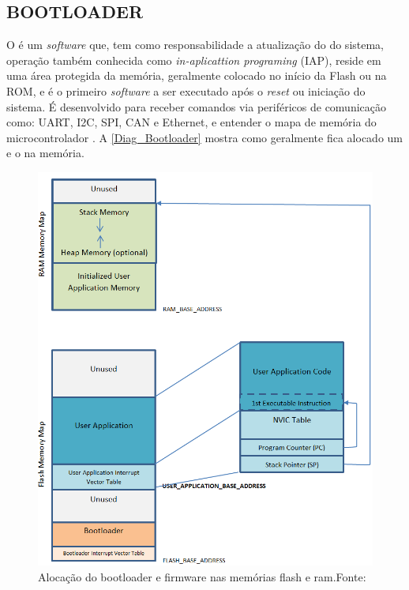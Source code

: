 \subsection{BOOTLOADER}
O \bootloader é um \textit{software} que, tem como responsabilidade a atualização do \firmware do sistema, operação também conhecida como \textit{in-aplicattion programing} (IAP),  reside em uma área protegida da memória, geralmente colocado no início da Flash ou na ROM, e é o primeiro \textit{software} a ser executado após o \textit{reset} ou iniciação do sistema.
É desenvolvido para receber comandos via periféricos de comunicação como: UART, I2C, SPI, CAN e Ethernet, e entender o mapa de memória do microcontrolador \cite{DavesDurlin2013}. A \autoref{Diag_Bootloader} mostra como geralmente fica alocado um \bootloader e o \firmware na memória.

\begin{figure}[H]
    \scriptsize
     \centering
     \includegraphics[scale=0.7]{dados/figuras/DiagBootloaderOriginal.png}
     \caption{Alocação do bootloader e firmware nas memórias flash e ram.\newline Fonte:\cite{DavesDurlin2013}}
     \label{Diag_Bootloader}
\end{figure}

